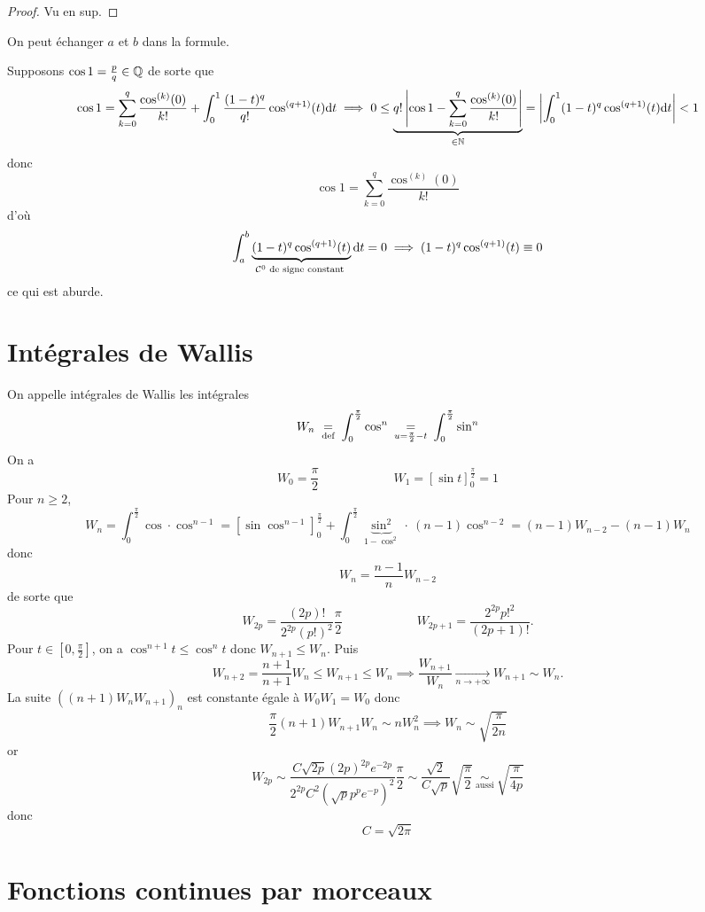 \begin{proof}
    Vu en sup.
\end{proof}

\begin{rem}
    On peut échanger $a$ et $b$ dans la formule.
\end{rem}

\begin{ex}
    Supposons $\cos 1=\frac pq\in\mathbb Q$ de sorte que \[
        \cos 1=\sum_{k=0}^q\frac{\cos^{(k)}(0)}{k!}+\int_0^1\frac{(1-t)^q}{q!}\cos^{(q+1)}(t)\mathrm{d} t\implies0\leq \underbrace{q! \left| \cos 1-\sum_{k=0}^q\frac{\cos^{(k)}(0)}{k!} \right|}_{\in\mathbb N}= \left| \int_0^1(1-t)^q\cos^{(q+1)}(t)\mathrm{d} t \right|<1
    \]
    donc \[
        \cos 1=\sum_{k=0}^q\frac{\cos^{(k)}(0)}{k!}
    \]
    d'où \[
        \int_a^b\underbrace{(1-t)^q\cos^{(q+1)}(t)}_{\mathcal C^0\text{ de signe constant }}\mathrm{d} t=0\implies (1-t)^q\cos^{(q+1)}(t)\equiv 0
    \]
    ce qui est aburde.
\end{ex}

\section{Intégrales de Wallis}
\label{sec:wallis}

On appelle intégrales de Wallis les intégrales \[
    W_n\;\underset{\text{def}}=\;\int_0^{\frac\pi2}\cos^n\underset{\;u=\frac\pi2-t\;}=\int_0^{\frac\pi2}\sin^n
\]
On a \[
    W_0=\frac\pi2\qquad \qquad \qquad W_1=[\sin t]_0^{\frac\pi2}=1
\]
Pour $n\geq 2$, \[
    W_n=\int_0^{\frac\pi2}\cos \cdot \cos^{n-1}=[\sin\cos^{n-1}]_0^{\frac\pi2}+\int_0^{\frac\pi2}\underbrace{\sin^2}_{1-\cos^2}\cdot~(n-1)\cos^{n-2}=(n-1)W_{n-2}-(n-1)W_n
\]
donc \[
W_n=\frac{n-1}nW_{n-2}
\]
de sorte que \[
    W_{2p}=\frac{(2p)!}{2^{2p}(p!)^2}\frac\pi2\qquad\qquad\qquad W_{2p+1}=\frac{2^{2p}p!^2}{(2p+1)!}.
\]
Pour $t\in [0, \frac\pi2]$, on a $\cos^{n+1}t\leq \cos^nt$ donc $W_{n+1}\leq W_n$. Puis \[
    W_{n+2}=\frac{n+1}{n+1}W_n\leq W_{n+1}\leq W_n \implies \frac{W_{n+1}}{W_n}\xrightarrow[n\to+\infty]{}W_{n+1}\sim W_n.
\]
La suite $((n+1)W_nW_{n+1})_n$ est constante égale à $W_0W_1=W_0$ donc \[
    \frac\pi2(n+1)W_{n+1}W_n\sim nW_n^2\implies W_n\sim\sqrt{\frac{\pi}{2n}}
\]
or \[
    W_{2p}\sim\frac{C\sqrt{2p}(2p)^{2p}e^{-2p}}{2^{2p}C^2(\sqrt pp^pe^{-p})^2}\frac\pi2\sim \frac{\sqrt2}{C\sqrt p}\sqrt{\frac\pi2}\underset{\text{ aussi }}\sim\sqrt{\frac{\pi}{4p}}
\]
donc \[
    C=\sqrt {2\pi}
\]

\section{Fonctions continues par morceaux}

